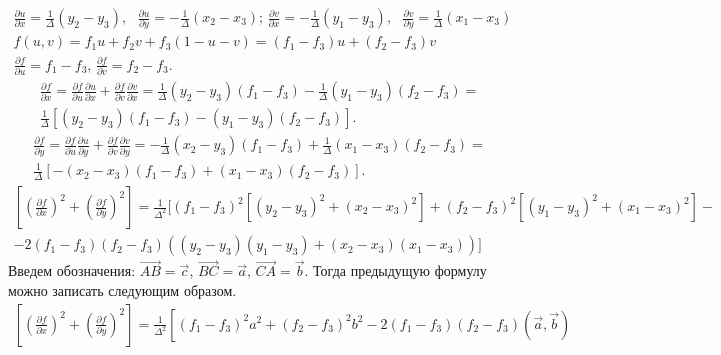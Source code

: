 \documentclass{article}
\begin{document}
\begin{enumerate}
\begin{multline*}
        \frac{\partial u}{\partial x} = \frac{1}{\Delta}(y_2 - y_3), \mbox{ } \frac{\partial u}{\partial y} = -\frac{1}{\Delta}(x_2 - x_3) \mbox{; }
        \frac{\partial v}{\partial x} = -\frac{1}{\Delta}(y_1 - y_3), \mbox{ } \frac{\partial v}{\partial y} = \frac{1}{\Delta}(x_1 - x_3) \\
        f(u, v) = f_1 u + f_2 v + f_3(1-u-v) = (f_1 - f_3) u + (f_2 - f_3) v \\
        \frac{\partial f}{\partial u} = f_1 - f_3 \mbox{, } \frac{\partial f}{\partial v} = f_2 - f_3. 
    \end{multline*}
    \begin{multline*}
        \frac{\partial f}{\partial x} = \frac{\partial f}{\partial u} \frac{\partial u}{\partial x} + \frac{\partial f}{\partial v} \frac{\partial v}{\partial x} = 
            \frac{1}{\Delta}(y_2 - y_3)(f_1 - f_3) - \frac{1}{\Delta}(y_1 - y_3)(f_2 - f_3) = \\
            \frac{1}{\Delta}\left[(y_2 - y_3)(f_1 - f_3) - (y_1 - y_3)(f_2 - f_3)\right]. 
    \end{multline*}
    \begin{multline*}
        \frac{\partial f}{\partial y} = \frac{\partial f}{\partial u} \frac{\partial u}{\partial y} + \frac{\partial f}{\partial v} \frac{\partial v}{\partial y} = 
            -\frac{1}{\Delta}(x_2 - y_3)(f_1 - f_3) + \frac{1}{\Delta}(x_1 - x_3)(f_2 - f_3) = \\
            \frac{1}{\Delta}\left[-(x_2 - x_3)(f_1 - f_3) + (x_1 - x_3)(f_2 - f_3)\right]. 
    \end{multline*}
    \begin{multline*}
        \left[\left(\frac{\partial f}{\partial x}\right)^2 + \left(\frac{\partial f}{\partial y}\right)^2 \right] = 
        \frac{1}{\Delta^2} 
        [
            (f_1 - f_3)^2 [(y_2 - y_3)^2 + (x_2 - x_3)^2] + (f_2 - f_3)^2 [(y_1 - y_3)^2 + (x_1 - x_3)^2] - \\
            - 2 (f_1 - f_3)(f_2 - f_3)((y_2 - y_3)(y_1 - y_3) + (x_2 - x_3)(x_1 - x_3))
        ]
    \end{multline*}
    Введем обозначения: $\vec{AB} = \vec{c}$, $\vec{BC} = \vec{a}$, $\vec{CA} = \vec{b}$. Тогда предыдущую формулу можно записать следующим образом.
    \begin{multline*}
        \left[\left(\frac{\partial f}{\partial x}\right)^2 + \left(\frac{\partial f}{\partial y}\right)^2 \right] = 
        \frac{1}{\Delta^2} 
        \left[
            (f_1 - f_3)^2 a^2 + (f_2 - f_3)^2 b^2 - 2 (f_1 - f_3)(f_2 - f_3)(\vec{a}, \vec{b}) 

\end{multline*}
\end{enumerate}
\end{document}
